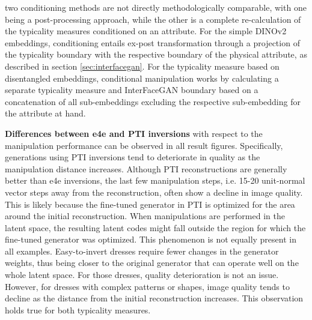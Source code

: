 two conditioning methods are not directly methodologically comparable, with one being a post-processing approach, while the other is a complete re-calculation of the typicality measures conditioned on an attribute. For the simple DINOv2 embeddings, conditioning entails ex-post transformation through a projection of the typicality boundary with the respective boundary of the physical attribute, as described in section \ref{sec:interfacegan}. For the typicality measure based on disentangled embeddings, conditional manipulation works by calculating a separate typicality measure and InterFaceGAN boundary based on a concatenation of all sub-embeddings excluding the respective sub-embedding for the attribute at hand.


\textbf{Differences between e4e and PTI inversions} with respect to the manipulation performance can be observed in all result figures. Specifically, generations using PTI inversions tend to deteriorate in quality as the manipulation distance increases. Although PTI reconstructions are generally better than e4e inversions, the last few manipulation steps, i.e. 15-20 unit-normal vector steps away from the reconstruction, often show a decline in image quality. This is likely because the fine-tuned generator in PTI is optimized for the area around the initial reconstruction. When manipulations are performed in the latent space, the resulting latent codes might fall outside the region for which the fine-tuned generator was optimized. This phenomenon is not equally present in all examples. Easy-to-invert dresses require fewer changes in the generator weights, thus being closer to the original generator that can operate well on the whole latent space. For those dresses, quality deterioration is not an issue. However, for dresses with complex patterns or shapes, image quality tends to decline as the distance from the initial reconstruction increases. This observation holds true for both typicality measures.

\FloatBarrier


